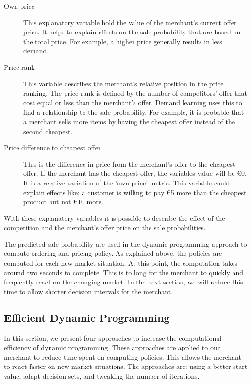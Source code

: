 \begin{description}
	\item [Own price]
		This explanatory variable hold the value of the merchant's current offer price.
		It helps to explain effects on the sale probability that are based on the total price.
		For example, a higher price generally results in less demand.
	\item [Price rank]
		This variable describes the merchant's relative position in the price ranking.
		The price rank is defined by the number of competitors' offer that cost equal or less than the merchant's offer.
		Demand learning uses this to find a relationship to the sale probability.
		For example, it is probable that a merchant sells more items by having the cheapest offer instead of the second cheapest.
	\item [Price difference to cheapest offer]
		This is the difference in price from the merchant's offer to the cheapest offer.
		If the merchant has the cheapest offer, the variables value will be €0.
		It is a relative variation of the 'own price' metric.
		This variable could explain effects like: a customer is willing to pay €5 more than the cheapest product but not €10 more.
\end{description}

With these explanatory variables it is possible to describe the effect of the competition and the merchant's offer price on the sale probabilities.

The predicted sale probability are used in the dynamic programming approach to compute ordering and pricing policy.
As explained above, the policies are computed for each new market situation.
At this point, the computation takes around two seconds to complete.
This is to long for the merchant to quickly and frequently react on the changing market.
In the next section, we will reduce this time to allow shorter decision intervals for the merchant.


\subsection{Efficient Dynamic Programming}
\label{section:faster_dyn_prog}
In this section, we present four approaches to increase the computational efficiency of dynamic programming.
These approaches are applied to our merchant to reduce time spent on computing policies.
This allows the merchant to react faster on new market situations.
The approaches are: using a better start value, adapt decision sets, and tweaking the number of iterations.

